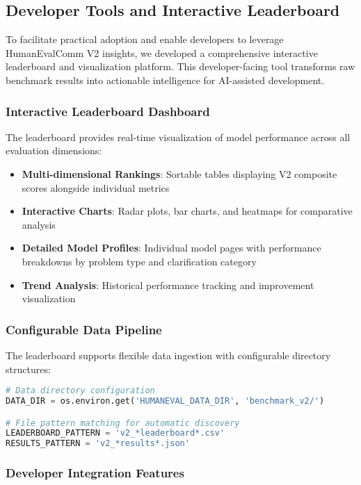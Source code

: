 \documentclass[conference]{IEEEtran}
\begin{document}
\subsection{Developer Tools and Interactive Leaderboard}

To facilitate practical adoption and enable developers to leverage HumanEvalComm V2 insights, we developed a comprehensive interactive leaderboard and visualization platform. This developer-facing tool transforms raw benchmark results into actionable intelligence for AI-assisted development.

\subsubsection{Interactive Leaderboard Dashboard}

The leaderboard provides real-time visualization of model performance across all evaluation dimensions:

\begin{itemize}
    \item \textbf{Multi-dimensional Rankings}: Sortable tables displaying V2 composite scores alongside individual metrics
    \item \textbf{Interactive Charts}: Radar plots, bar charts, and heatmaps for comparative analysis
    \item \textbf{Detailed Model Profiles}: Individual model pages with performance breakdowns by problem type and clarification category
    \item \textbf{Trend Analysis}: Historical performance tracking and improvement visualization
\end{itemize}

\subsubsection{Configurable Data Pipeline}

The leaderboard supports flexible data ingestion with configurable directory structures:

\begin{lstlisting}[language=Python]
# Data directory configuration
DATA_DIR = os.environ.get('HUMANEVAL_DATA_DIR', 'benchmark_v2/')

# File pattern matching for automatic discovery
LEADERBOARD_PATTERN = 'v2_*leaderboard*.csv'
RESULTS_PATTERN = 'v2_*results*.json'
\end{lstlisting}

\subsubsection{Developer Integration Features}
\end{document}
